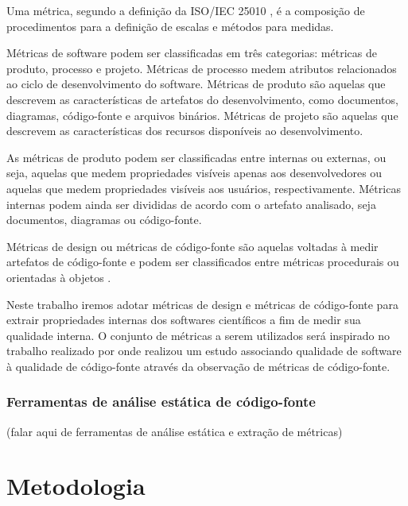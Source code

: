\documentclass[qual, classic, a4paper]{ufbathesis}
\begin{document}
Uma métrica, segundo a definição da ISO/IEC 25010 \cite{iso2011iec25010}, é a
composição de procedimentos para a definição de escalas e métodos para
medidas.

Métricas de software podem ser classificadas em três categorias: métricas de
produto, processo e projeto. Métricas de processo medem atributos relacionados
ao ciclo de desenvolvimento do software. Métricas de produto são aquelas que
descrevem as características de artefatos do desenvolvimento, como documentos,
diagramas, código-fonte e arquivos binários. Métricas de projeto são aquelas
que descrevem as características dos recursos disponíveis ao desenvolvimento.

As métricas de produto podem ser classificadas entre internas ou externas, ou
seja, aquelas que medem propriedades visíveis apenas aos desenvolvedores ou
aquelas que medem propriedades visíveis aos usuários, respectivamente.
Métricas internas podem ainda ser divididas de acordo com o artefato
analisado, seja documentos, diagramas ou código-fonte.

Métricas de design ou métricas de código-fonte são aquelas voltadas à medir
artefatos de código-fonte e podem ser classificados entre métricas procedurais
ou orientadas à objetos \cite{Mohamed1994}.

Neste trabalho iremos adotar métricas de design e métricas de código-fonte
para extrair propriedades internas dos softwares científicos a fim de medir
sua qualidade interna. O conjunto de métricas a serem utilizados será
inspirado no trabalho realizado por  onde realizou
um estudo associando qualidade de software à qualidade de código-fonte através
da observação de métricas de código-fonte.

\subsection{Ferramentas de análise estática de código-fonte}

(falar aqui de ferramentas de análise estática e extração de métricas)

\chapter{Metodologia}
\end{document}
